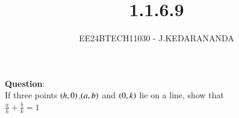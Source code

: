 \documentclass[journal]{IEEEtran}
\begin{document}

\vspace{3cm}

\title{1.1.6.9}
\author{EE24BTECH11030 - J.KEDARANANDA
}
{\let\newpage\relax\maketitle}

\renewcommand{\thefigure}{\theenumi}
\renewcommand{\thetable}{\theenumi}
\setlength{\intextsep}{10pt} %


\renewcommand{\thetable}{\theenumi}


\textbf{Question}:\\
If three points $\left(h,0\right)$,$\left(a,b\right)$ and $\left(0,k\right)$ lie on a line, show that \\
$\frac{a}{h} + \frac{b}{k} = 1$\\
\end{document}
